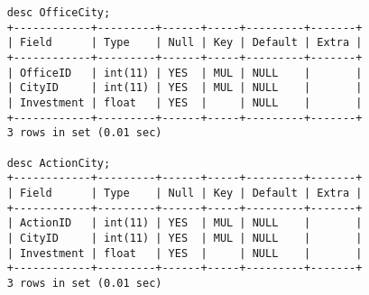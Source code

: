 \documentclass[13pt,a4paper]{report}
\begin{document}
\begin{itemize}
\begin{lstlisting}
	desc OfficeCity;
	+------------+---------+------+-----+---------+-------+
	| Field      | Type    | Null | Key | Default | Extra |
	+------------+---------+------+-----+---------+-------+
	| OfficeID   | int(11) | YES  | MUL | NULL    |       |
	| CityID     | int(11) | YES  | MUL | NULL    |       |
	| Investment | float   | YES  |     | NULL    |       |
	+------------+---------+------+-----+---------+-------+
	3 rows in set (0.01 sec)

	desc ActionCity;
	+------------+---------+------+-----+---------+-------+
	| Field      | Type    | Null | Key | Default | Extra |
	+------------+---------+------+-----+---------+-------+
	| ActionID   | int(11) | YES  | MUL | NULL    |       |
	| CityID     | int(11) | YES  | MUL | NULL    |       |
	| Investment | float   | YES  |     | NULL    |       |
	+------------+---------+------+-----+---------+-------+
	3 rows in set (0.01 sec)

\end{lstlisting}
\end{itemize}
\end{document}
